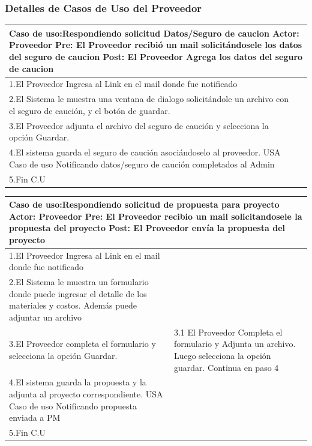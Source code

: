 \subsubsection{Detalles de Casos de Uso del Proveedor}
\begin{longtable}{|p{}|p{}|}
    \hline
    \multicolumn{2}{|p{16cm}|}{
        \textbf{Caso de uso:}Respondiendo solicitud Datos/Seguro de caucion\newline
        \textbf{Actor:} Proveedor\newline
        \textbf{Pre: }El Proveedor recibió un mail solicitándosele los datos del seguro de caucion\newline
        \textbf{Post:}  El Proveedor Agrega los datos del seguro de caucion
    }\\
    \hline
    1.El Proveedor Ingresa al Link en el mail donde fue notificado&    \\
    \hline
    2.El Sistema le muestra una ventana de dialogo solicitándole un archivo con el seguro de caución, y el botón de guardar.& \\
    \hline
    3.El Proveedor adjunta el archivo del seguro de caución y selecciona la opción Guardar. &\\
    \hline
    4.El sistema guarda el seguro de caución asociándoselo al proveedor. USA Caso de uso Notificando datos/seguro de caución completados al Admin&\\
    \hline
    5.Fin C.U&\\
    \hline
\end{longtable}

\begin{longtable}{|p{}|p{}|}
    \hline
    \multicolumn{2}{|p{16cm}|}{
        \textbf{Caso de uso:}Respondiendo solicitud de propuesta para proyecto\newline
        \textbf{Actor:} Proveedor\newline
        \textbf{Pre: }El Proveedor recibio un mail solicitandosele la propuesta del proyecto\newline
        \textbf{Post:}  El Proveedor envía la propuesta del proyecto
    }\\
    \hline
    1.El Proveedor Ingresa al Link en el mail donde fue notificado&    \\
    \hline
    2.El Sistema le muestra un formulario donde puede ingresar el detalle de los materiales y costos. Además puede adjuntar un archivo& \\
    \hline
    3.El Proveedor completa el formulario y selecciona la opción Guardar. &3.1 El Proveedor Completa el formulario y Adjunta un archivo. Luego selecciona la opción guardar. Continua en paso 4\\
    \hline
    4.El sistema guarda la propuesta y la adjunta al proyecto correspondiente. USA Caso de uso Notificando propuesta enviada a PM&\\
    \hline
    5.Fin C.U&\\
    \hline
\end{longtable}

